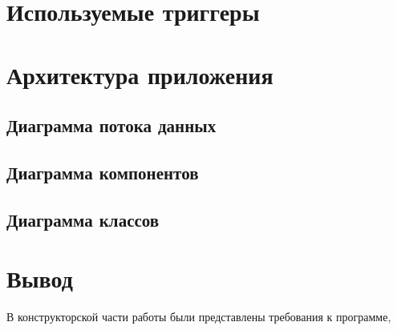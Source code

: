 \section{Используемые триггеры}

\section{Архитектура приложения}

\subsection{Диаграмма потока данных}

\subsection{Диаграмма компонентов}

\subsection{Диаграмма классов}


\section{Вывод}

В конструкторской части работы были представлены требования к программе, 

\clearpage
